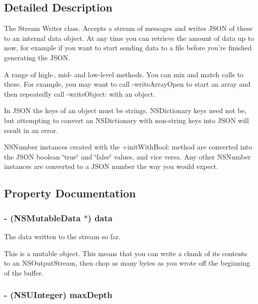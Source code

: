\subsection{Detailed Description}
The Stream Writer class. Accepts a stream of messages and writes JSON of these to an internal data object. At any time you can retrieve the amount of data up to now, for example if you want to start sending data to a file before you're finished generating the JSON.

A range of high-\/, mid-\/ and low-\/level methods. You can mix and match calls to these. For example, you may want to call -\/writeArrayOpen to start an array and then repeatedly call -\/writeObject: with an object.

In JSON the keys of an object must be strings. NSDictionary keys need not be, but attempting to convert an NSDictionary with non-\/string keys into JSON will result in an error.

NSNumber instances created with the +initWithBool: method are converted into the JSON boolean \char`\"{}true\char`\"{} and \char`\"{}false\char`\"{} values, and vice versa. Any other NSNumber instances are converted to a JSON number the way you would expect. 

\subsection{Property Documentation}
\hypertarget{interface_s_b_json_stream_writer_a12523a0a0f27604fa52a5da8e78e1ff3}{
\subsubsection[{data}]{\setlength{\rightskip}{0pt plus 5cm}-\/ (NSMutableData $\ast$) data}}
\label{interface_s_b_json_stream_writer_a12523a0a0f27604fa52a5da8e78e1ff3}


The data written to the stream so far. 

This is a mutable object. This means that you can write a chunk of its contents to an NSOutputStream, then chop as many bytes as you wrote off the beginning of the buffer. \hypertarget{interface_s_b_json_stream_writer_a146e7e950ab74a0e766ffd860e454fc9}{
\subsubsection[{maxDepth}]{\setlength{\rightskip}{0pt plus 5cm}-\/ (NSUInteger) maxDepth}}
\label{interface_s_b_json_stream_writer_a146e7e950ab74a0e766ffd860e454fc9}


